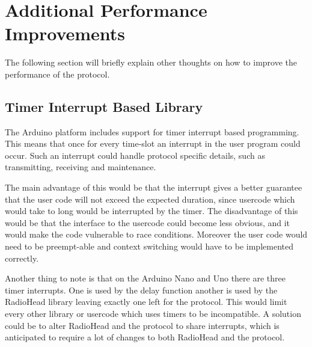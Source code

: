 \section{Additional Performance Improvements}
The following section will briefly explain other thoughts on how to improve the performance of the protocol.
\subsection{Timer Interrupt Based Library}
The Arduino platform includes support for timer interrupt based programming.
This means that once for every time-slot an interrupt in the user program could occur.
Such an interrupt could handle protocol specific details, such as transmitting, receiving and maintenance.

The main advantage of this would be that the interrupt gives a better guarantee that the user code will not exceed the expected duration, since usercode which would take to long would be interrupted by the timer.
The disadvantage of this would be that the interface to the usercode could become less obvious, and it would make the code vulnerable to race conditions.
Moreover the user code would need to be preempt-able and context switching would have to be implemented correctly.

Another thing to note is that on the Arduino Nano and Uno there are three timer interrupts.
One is used by the delay function another is used by the RadioHead library leaving exactly one left for the protocol.
This would limit every other library or usercode which uses timers to be incompatible.
A solution could be to alter RadioHead and the protocol to share interrupts, which is anticipated to require a lot of changes to both RadioHead and the protocol.

